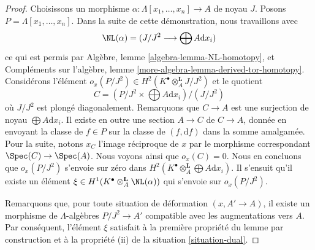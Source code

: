 \begin{proof}
Choisissons un morphisme $\alpha : \Lambda[x_1, \ldots, x_n] \to A$ de noyau
$J$. Posons $P = \Lambda[x_1, \ldots, x_n]$. Dans la suite de cette
démonstration, nous travaillons avec
$$
\NL(\alpha) = (J/J^2 \longrightarrow \bigoplus A \text{d}x_i)
$$
ce qui est permis par Algèbre, lemme \ref{algebra-lemma-NL-homotopy}, et
Compléments sur l'algèbre, lemme
\ref{more-algebra-lemma-derived-tor-homotopy}. Considérons l'élément
$o_x(P/J^2) \in H^2(K^\bullet \otimes_A^\mathbf{L} J/J^2)$ et le quotient
$$
C = (P/J^2 \times \bigoplus A \text{d}x_i)/(J/J^2)
$$
où $J/J^2$ est plongé diagonalement. Remarquons que $C \to A$ est une
surjection de noyau $\bigoplus A\text{d}x_i$. Il existe en outre une section
$A \to C$ de $C \to A$, donnée en envoyant la classe de $f \in P$ sur la
classe de $(f, \text{d}f)$ dans la somme amalgamée. Pour la suite, notons
$x_C$ l'image réciproque de $x$ par le morphisme correspondant
$\Spec(C) \to \Spec(A)$. Nous voyons ainsi que $o_x(C) = 0$. Nous en concluons
que $o_x(P/J^2)$ s'envoie sur zéro dans
$H^2(K^\bullet \otimes_A^\mathbf{L} \bigoplus A\text{d}x_i)$.
Il s'ensuit qu'il existe un élément
$\xi \in H^1(K^\bullet \otimes_A^\mathbf{L} \NL(\alpha))$
qui s'envoie sur $o_x(P/J^2)$.

\medskip\noindent
Remarquons que, pour toute situation de déformation $(x, A' \to A)$, il existe
un morphisme de $\Lambda$-algèbres $P/J^2 \to A'$ compatible avec les
augmentations vers $A$. Par conséquent, l'élément $\xi$ satisfait à la première
propriété du lemme par construction et à la propriété (ii) de la situation
\ref{situation-dual}.


\end{proof}
